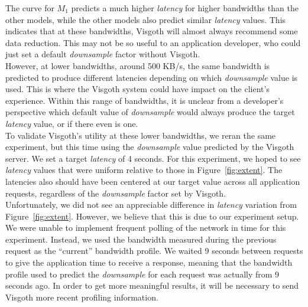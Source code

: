 The curve for $M_1$ predicts a much higher \emph{latency} for higher bandwidths
than the other models, while the other models also predict similar
\emph{latency} values. This indicates that at these bandwidths, Visgoth will
almost always recommend some data reduction. This may not be so useful to an
application developer, who could just set a default \emph{downsample} factor
without Visgoth. \\

However, at lower bandwidths, around 500 KB/s, the same bandwidth is predicted
to produce different latencies depending on which \emph{downsample} value is
used. This is where the Visgoth system could have impact on the client's
experience. Within this range of bandwidths, it is unclear from a developer's
perspective which default value of \emph{downsample} would always produce the
target \emph{latency} value, or if there even is one.\\

To validate Visgoth's utility at these lower bandwidths, we reran the same
experiment, but this time using the \emph{downsample} value predicted by the
Visgoth server. We set a target \emph{latency} of 4 seconds. For this
experiment, we hoped to see \emph{latency} values that were uniform relative to
those in Figure~\ref{fig:extent}. The latencies also should have been centered
at our target value across all application requests, regardless of the
\emph{downsample} factor set by Visgoth.\\

Unfortunately, we did not see an appreciable difference in \emph{latency}
variation from Figure~\ref{fig:extent}. However, we believe that this is due to
our experiment setup. We were unable to implement frequent polling of the
network in time for this experiment. Instead, we used the bandwidth measured
during the previous request as the ``current'' bandwidth profile. We waited 9
seconds between requests to give the application time to receive a response,
meaning that the bandwidth profile used to predict the \emph{downsample} for
each request was actually from 9 seconds ago. In order to get more meaningful
results, it will be necessary to send Visgoth more recent profiling
information.

